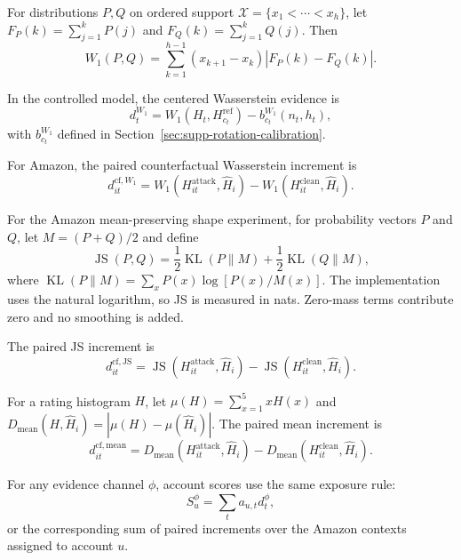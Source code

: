 For distributions $P,Q$ on ordered support
$\mathcal X=\{x_1<\cdots<x_h\}$, let
$F_P(k)=\sum_{j=1}^{k}P(j)$ and
$F_Q(k)=\sum_{j=1}^{k}Q(j)$. Then
\[
W_1(P,Q)
=
\sum_{k=1}^{h-1}
(x_{k+1}-x_k)
\left|
F_P(k)-F_Q(k)
\right|.
\]

In the controlled model, the centered Wasserstein evidence is
\begin{equation}
\label{eq:supp-eval-centered-w1}
d_t^{W_1}
=
W_1(H_t,H_{c_t}^{\mathrm{ref}})
-
b_{c_t}^{W_1}(n_t,h_t),
\end{equation}
with $b_{c_t}^{W_1}$ defined in
Section~\ref{sec:supp-rotation-calibration}.

For Amazon, the paired counterfactual Wasserstein increment is
\begin{equation}
\label{eq:supp-eval-cf-w1}
d_{it}^{\mathrm{cf},W_1}
=
W_1(H_{it}^{\mathrm{attack}},\widehat H_i)
-
W_1(H_{it}^{\mathrm{clean}},\widehat H_i).
\end{equation}

For the Amazon mean-preserving shape experiment, for probability vectors $P$ and $Q$, let $M=(P+Q)/2$ and define
\begin{equation}
\label{eq:supp-js}
\operatorname{JS}(P,Q)
=
\frac{1}{2}\operatorname{KL}(P\|M)
+
\frac{1}{2}\operatorname{KL}(Q\|M),
\end{equation}
where
$\operatorname{KL}(P\|M)
=
\sum_x P(x)\log[P(x)/M(x)]$.
The implementation uses the natural logarithm, so JS is measured in nats.
Zero-mass terms contribute zero and no smoothing is added.

The paired JS increment is
\begin{equation}
\label{eq:supp-eval-cf-js}
d_{it}^{\mathrm{cf},\mathrm{JS}}
=
\operatorname{JS}(H_{it}^{\mathrm{attack}},\widehat H_i)
-
\operatorname{JS}(H_{it}^{\mathrm{clean}},\widehat H_i).
\end{equation}

For a rating histogram $H$, let
$\mu(H)=\sum_{x=1}^{5}xH(x)$ and
$D_{\mathrm{mean}}(H,\widehat H_i)
=
|\mu(H)-\mu(\widehat H_i)|$.
The paired mean increment is
\begin{equation}
\label{eq:supp-eval-cf-mean}
d_{it}^{\mathrm{cf},\mathrm{mean}}
=
D_{\mathrm{mean}}(H_{it}^{\mathrm{attack}},\widehat H_i)
-
D_{\mathrm{mean}}(H_{it}^{\mathrm{clean}},\widehat H_i).
\end{equation}

For any evidence channel $\phi$, account scores use the same exposure rule:
\begin{equation}
\label{eq:supp-common-account-score}
S_u^\phi
=
\sum_t a_{u,t}d_t^\phi,
\end{equation}
or the corresponding sum of paired increments over the Amazon contexts
assigned to account $u$.

